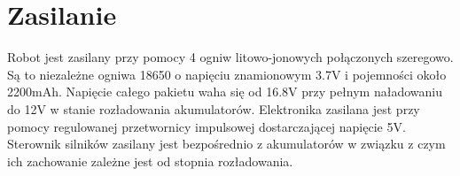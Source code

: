 \section{Zasilanie}

Robot jest zasilany przy pomocy 4 ogniw litowo-jonowych połączonych szeregowo. Są to niezależne ogniwa 18650 o napięciu znamionowym 3.7V i pojemności około 2200mAh. Napięcie całego pakietu waha się od 16.8V przy pełnym naładowaniu do 12V w stanie rozładowania akumulatorów. Elektronika zasilana jest przy pomocy regulowanej przetwornicy impulsowej dostarczającej napięcie 5V. Sterownik silników zasilany jest bezpośrednio z akumulatorów w związku z czym ich zachowanie zależne jest od stopnia rozładowania.



